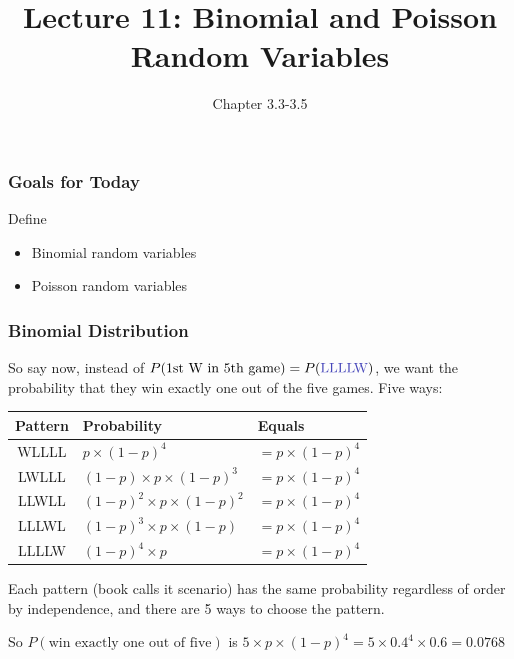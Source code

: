 \documentclass[handout]{beamer}
\title{Lecture 11: Binomial and Poisson Random Variables}
\author{Chapter 3.3-3.5}
\date{}
\newcommand{\blue}[1]{\textcolor{blue2}{#1}}
\begin{document}
\begin{frame}
\titlepage
\end{frame}


\begin{frame}[fragile]
\frametitle{Goals for Today}

Define
\begin{itemize}
\item Binomial random variables
\item Poisson random variables
\end{itemize}


\end{frame}


\begin{frame}
\frametitle{Binomial Distribution}

So say now, instead of $P(\mbox{1st W in 5th game}) = P(\mbox{\blue{LLLLW}})$, we want the probability that they win \blue{exactly one} out of the five games.  Five ways:

\pause\begin{center}
\begin{tabular}{c|ll}
Pattern & Probability & Equals\\
\hline
\blue{WLLLL} & $p \times (1-p)^4$ & $=p\times(1-p)^4$\\
\blue{LWLLL} & $(1-p) \times p \times (1-p)^3$ & $=p\times(1-p)^4$\\
\blue{LLWLL} & $(1-p)^2 \times p \times (1-p)^2$& $=p\times(1-p)^4$\\
\blue{LLLWL} & $(1-p)^3 \times p \times (1-p)$& $=p\times(1-p)^4$\\
\blue{LLLLW} & $(1-p)^4 \times p$& $=p\times(1-p)^4$\\
\end{tabular} 
\end{center}

\pause Each pattern (book calls it scenario) has the same probability regardless of order by independence, and there are 5 ways to \blue{choose} the pattern.

\vspace{0.25cm}

\pause So $P(\mbox{win exactly one out of five})$ is  $5 \times p\times(1-p)^4 = 5 \times 0.4^4 \times 0.6 = 0.0768$

\end{frame}
\end{document}
